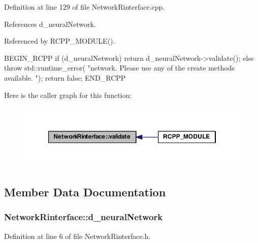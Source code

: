 Definition at line 129 of file NetworkRinterface.cpp.



References d\_\-neuralNetwork.



Referenced by RCPP\_\-MODULE().


\begin{DoxyCode}
{
BEGIN_RCPP if (d_neuralNetwork)
  {
    return d_neuralNetwork->validate();
  }
else
  {
    throw std::runtime_error(
        "\nUninitialized network. Please use any of the create methods available.
      \n");
    return false;
  }
END_RCPP
}
\end{DoxyCode}


Here is the caller graph for this function:\nopagebreak
\begin{figure}[H]
\begin{center}
\leavevmode
\includegraphics[width=358pt]{class_network_rinterface_a1b37bfff06e29aedd525fa25137b94e1_icgraph}
\end{center}
\end{figure}




\subsection{Member Data Documentation}
\hypertarget{class_network_rinterface_a841abcde82202671c51525b61ce6a47d}{
\subsubsection[{d\_\-neuralNetwork}]{ {\bf NetworkRinterface::d\_\-neuralNetwork}}}
\label{class_network_rinterface_a841abcde82202671c51525b61ce6a47d}


Definition at line 6 of file NetworkRinterface.h.



